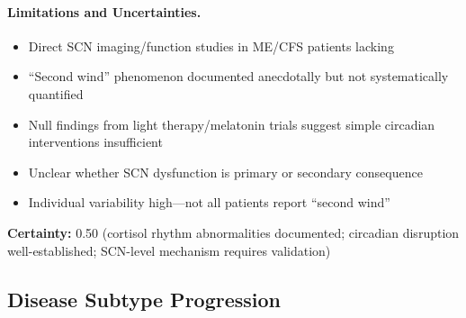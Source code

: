 \begin{hypothesis}
\paragraph{Limitations and Uncertainties.}
\begin{itemize}
  \item Direct SCN imaging/function studies in ME/CFS patients lacking
  \item ``Second wind'' phenomenon documented anecdotally but not systematically quantified
  \item Null findings from light therapy/melatonin trials suggest simple circadian interventions insufficient
  \item Unclear whether SCN dysfunction is primary or secondary consequence
  \item Individual variability high---not all patients report ``second wind''
\end{itemize}

\textbf{Certainty:} 0.50 (cortisol rhythm abnormalities documented; circadian disruption well-established; SCN-level mechanism requires validation)
\end{hypothesis}

\subsection{Disease Subtype Progression}
\label{subsec:subtype-progression}


